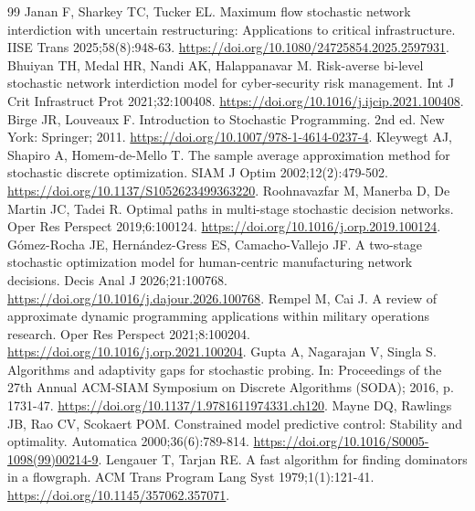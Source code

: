 \documentclass[preprint,11pt]{elsarticle}
\theoremstyle{definition}
\theoremstyle{remark}
\begin{document}
\begin{thebibliography}{99}
Janan F, Sharkey TC, Tucker EL. Maximum flow stochastic network interdiction with uncertain restructuring: Applications to critical infrastructure. IISE Trans 2025;58(8):948-63. \url{https://doi.org/10.1080/24725854.2025.2597931}.
Bhuiyan TH, Medal HR, Nandi AK, Halappanavar M. Risk-averse bi-level stochastic network interdiction model for cyber-security risk management. Int J Crit Infrastruct Prot 2021;32:100408. \url{https://doi.org/10.1016/j.ijcip.2021.100408}.
Birge JR, Louveaux F. Introduction to Stochastic Programming. 2nd ed. New York: Springer; 2011. \url{https://doi.org/10.1007/978-1-4614-0237-4}.
Kleywegt AJ, Shapiro A, Homem-de-Mello T. The sample average approximation method for stochastic discrete optimization. SIAM J Optim 2002;12(2):479-502. \url{https://doi.org/10.1137/S1052623499363220}.
Roohnavazfar M, Manerba D, De Martin JC, Tadei R. Optimal paths in multi-stage stochastic decision networks. Oper Res Perspect 2019;6:100124. \url{https://doi.org/10.1016/j.orp.2019.100124}.
Gómez-Rocha JE, Hernández-Gress ES, Camacho-Vallejo JF. A two-stage stochastic optimization model for human-centric manufacturing network decisions. Decis Anal J 2026;21:100768. \url{https://doi.org/10.1016/j.dajour.2026.100768}.
Rempel M, Cai J. A review of approximate dynamic programming applications within military operations research. Oper Res Perspect 2021;8:100204. \url{https://doi.org/10.1016/j.orp.2021.100204}.
Gupta A, Nagarajan V, Singla S. Algorithms and adaptivity gaps for stochastic probing. In: Proceedings of the 27th Annual ACM-SIAM Symposium on Discrete Algorithms (SODA); 2016, p. 1731-47. \url{https://doi.org/10.1137/1.9781611974331.ch120}.
Mayne DQ, Rawlings JB, Rao CV, Scokaert POM. Constrained model predictive control: Stability and optimality. Automatica 2000;36(6):789-814. \url{https://doi.org/10.1016/S0005-1098(99)00214-9}.
Lengauer T, Tarjan RE. A fast algorithm for finding dominators in a flowgraph. ACM Trans Program Lang Syst 1979;1(1):121-41. \url{https://doi.org/10.1145/357062.357071}.

\end{thebibliography}
\end{document}
